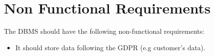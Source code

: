 \section{Non Functional Requirements}
The DBMS should have the following non-functional requirements:
\begin{itemize}
    \item It should store data following the GDPR (e.g customer’s data).    
\end{itemize}

